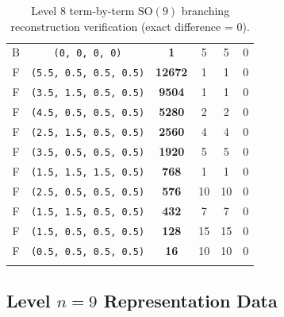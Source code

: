 \documentclass[11pt,a4paper]{article}
\begin{document}
\begin{longtable}{@{}cccccc@{}}
B & \texttt{(0, 0, 0, 0)} & \textbf{1} & 5 & 5 & 0 \\
F & \texttt{(5.5, 0.5, 0.5, 0.5)} & \textbf{12672} & 1 & 1 & 0 \\
F & \texttt{(3.5, 1.5, 0.5, 0.5)} & \textbf{9504} & 1 & 1 & 0 \\
F & \texttt{(4.5, 0.5, 0.5, 0.5)} & \textbf{5280} & 2 & 2 & 0 \\
F & \texttt{(2.5, 1.5, 0.5, 0.5)} & \textbf{2560} & 4 & 4 & 0 \\
F & \texttt{(3.5, 0.5, 0.5, 0.5)} & \textbf{1920} & 5 & 5 & 0 \\
F & \texttt{(1.5, 1.5, 1.5, 0.5)} & \textbf{768} & 1 & 1 & 0 \\
F & \texttt{(2.5, 0.5, 0.5, 0.5)} & \textbf{576} & 10 & 10 & 0 \\
F & \texttt{(1.5, 1.5, 0.5, 0.5)} & \textbf{432} & 7 & 7 & 0 \\
F & \texttt{(1.5, 0.5, 0.5, 0.5)} & \textbf{128} & 15 & 15 & 0 \\
F & \texttt{(0.5, 0.5, 0.5, 0.5)} & \textbf{16} & 10 & 10 & 0 \\
\bottomrule
\caption{Level 8 term-by-term $\mathrm{SO}(9)$ branching reconstruction verification (exact difference = 0).}
\end{longtable}

\subsection{Level $n = 9$ Representation Data}
\end{document}
